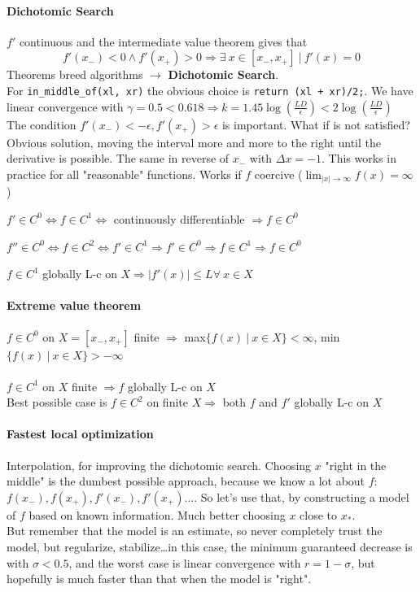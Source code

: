 \documentclass[10pt]{report}
\begin{document}
\paragraph{Dichotomic Search} $f'$ continuous and the intermediate value theorem gives that $$f'(x_-) < 0 \wedge f'(x_+) > 0 \Rightarrow \exists\:x\in[x_-, x_+]\:|\: f'(x) = 0$$
Theorems breed algorithms $\rightarrow$ \textbf{Dichotomic Search}.\\
For \texttt{in\_middle\_of(xl, xr)} the obvious choice is \texttt{return (xl + xr)/2;}. We have linear convergence with $\gamma = 0.5 < 0.618 \Rightarrow k = 1.45\log(\frac{LD}{\epsilon}) < 2 \log(\frac{LD}{\epsilon})$\\
The condition $f'(x_-) < -\epsilon, f'(x_+) > \epsilon$ is important. What if is not satisfied? Obvious solution, moving the interval more and more to the right until the derivative is possible. %
The same in reverse of $x_-$ with $\Delta x = -1$. This works in practice for all "reasonable" functions. Works if $f$ coercive ($\lim_{|x| \to \infty} f(x) = \infty$)\\
\begin{list}{}{}
	\item $f' \in C^0 \Leftrightarrow f \in C^1 \Leftrightarrow$ continuously differentiable $\Rightarrow f\in C^0$
	\item $f'' \in C^0 \Leftrightarrow f\in C^2 \Leftrightarrow f' \in C^1 \Rightarrow f' \in C^0 \Rightarrow f \in C^1 \Rightarrow f \in C^0$
	\item $f \in C^1$ globally L-c on $X \Rightarrow |f'(x)| \leq L \forall\: x \in X$
\end{list}
\paragraph{Extreme value theorem} $f \in C^0$ on $X = [x_-, x_+]$ finite $\Rightarrow$ max$\{f(x)\:|\: x\in X\} < \infty$, min$\{f(x)\:|\: x\in X\} > -\infty$\\\\
$f\in C^1$ on $X$ finite $\Rightarrow f$ globally L-c on $X$\\
Best possible case is $f\in C^2$ on finite $X\Rightarrow$ both $f$ and $f'$ globally L-c on $X$
\paragraph{Fastest local optimization} Interpolation, for improving the dichotomic search. Choosing $x$ "right in the middle" is the dumbest possible approach, because we know a lot about $f$: $f(x_-), f(x_+), f'(x_-), f'(x_+)\ldots$. So let's use that, by constructing a model of $f$ based on known information. Much better choosing $x$ close to $x_*$.\\
But remember that the model is an estimate, so never completely trust the model, but regularize, stabilize\ldots in this case, the minimum guaranteed decrease is with $\sigma < 0.5$, and the worst case is linear convergence with $r = 1 - \sigma$, but hopefully is much faster than that when the model is "right".
\end{document}
